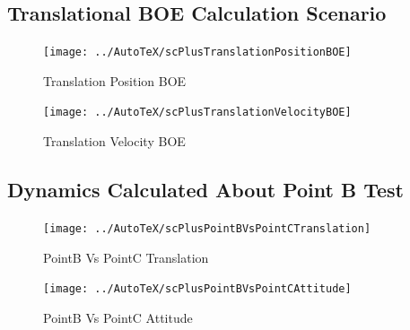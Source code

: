 \subsection{Translational BOE Calculation Scenario}
\begin{figure}[htbp]
	\centerline{
		\texttt{[image: ../AutoTeX/scPlusTranslationPositionBOE]}}
	\caption{Translation Position BOE}
	\label{fig:TranslationPositionBOE}
\end{figure}
\begin{figure}[htbp]
	\centerline{
		\texttt{[image: ../AutoTeX/scPlusTranslationVelocityBOE]}}
	\caption{Translation Velocity BOE}
	\label{fig:TranslationVelocityBOE}
\end{figure}
\clearpage

\subsection{Dynamics Calculated About Point B Test}
\begin{figure}[htbp]
	\centerline{
		\texttt{[image: ../AutoTeX/scPlusPointBVsPointCTranslation]}}
	\caption{PointB Vs PointC Translation}
	\label{fig:PointBVsPointCTranslation}
\end{figure}
\begin{figure}[htbp]
	\centerline{
		\texttt{[image: ../AutoTeX/scPlusPointBVsPointCAttitude]}}
	\caption{PointB Vs PointC Attitude}
	\label{fig:PointBVsPointCAttitude}
\end{figure}
\clearpage